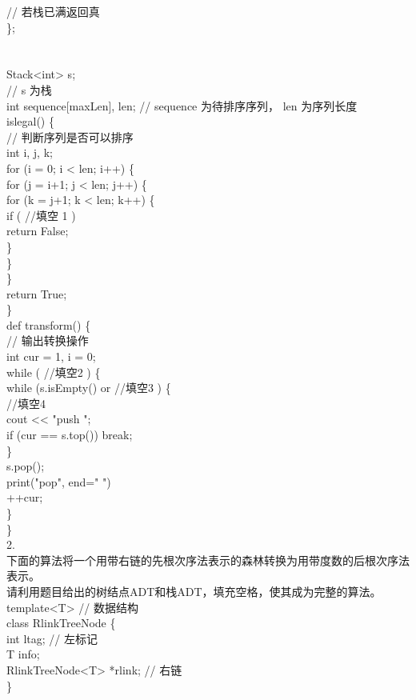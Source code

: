 \begin{question}
// 若栈已满返回真\\
\};\\
\\
\\
Stack<int> s;\\
//  s 为栈\\
int sequence[maxLen],  len;                 // sequence 为待排序序列， len 为序列长度\\
islegal()  \{\\
// 判断序列是否可以排序\\
int i, j, k;\\
for (i = 0; i < len; i++) \{\\
for (j = i+1; j < len; j++) \{\\
for (k = j+1; k < len; k++) \{\\
if (  //填空 1   )\\
return False;\\
\}\\
\}\\
\}\\
return True;\\
\}\\
def transform()  \{\\
// 输出转换操作\\
int cur = 1,  i = 0;\\
while  (  //填空2  ) \{\\
while (s.isEmpty()  or  //填空3 ) \{\\
//填空4\\
cout << "push ";\\
if (cur == s.top()) break;\\
\}\\
s.pop();\\
print("pop", end=" ")\\
++cur;\\
\}\\
\}\\
2.\\
下面的算法将一个用带右链的先根次序法表示的森林转换为用带度数的后根次序法表示。\\
请利用题目给出的树结点ADT和栈ADT，填充空格，使其成为完整的算法。\\
template<T>      // 数据结构\\
class RlinkTreeNode \{\\
int ltag;                // 左标记\\
T info;\\
RlinkTreeNode<T> *rlink; // 右链\\
\}\\

\end{question}
